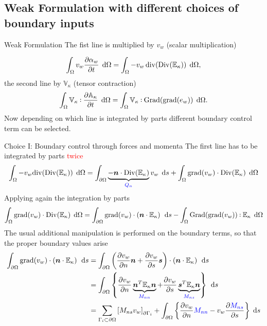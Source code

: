 \documentclass{beamer}
\def\onedot{$\mathsurround0pt\ldotp$}
\def\cddot{%
	\mathbin{\vcenter{\baselineskip.67ex
			\hbox{\onedot}\hbox{\onedot}}%
}}
\newcommand{\blue}[1]{\textcolor{blue}{#1}}
\newcommand{\red}[1]{\textcolor{red}{#1}}
\begin{document}
\subsection{Weak Formulation with different choices of boundary inputs}

\begin{frame}{Weak Formulation}
The fist line  is multiplied  by $v_w$ (scalar multiplication)

\[
\int_{\Omega} v_w \diffp{\alpha_w}{t} \,  \d\Omega =  \int_{\Omega} -v_w \, \mathrm{div}(\mathrm{Div}(\mathbb{E}_{\kappa})) \, \d\Omega,
\]
the second line by $\mathbb{V}_{\kappa}$ (tensor contraction)
\[
\int_{\Omega} \mathbb{V}_{\kappa} \cddot \diffp{\mathbb{A}_{\kappa}}{t} \,  \d\Omega = \int_{\Omega} \mathbb{V}_{\kappa} \cddot  \mathrm{Grad}(\mathrm{grad}(e_w)) \,   \d\Omega.
\]
Now depending on which line is integrated by parts different boundary control term can be selected. 
\end{frame}

\begin{frame}{Choice I: Boundary control through forces and momenta}
The first line has to be integrated by parts \red{twice}
\small
\begin{equation*}
\int_{\Omega} - v_w \mathrm{div}(\mathrm{Div}(\mathbb{E}_{\kappa})) \, \d\Omega = \int_{\partial \Omega} \underbrace{- \bm{n} \cdot \mathrm{Div}(\mathbb{E}_{\kappa})}_{\blue{Q_n}} v_w \, \d{s} + \int_{\Omega} \mathrm{grad}(v_w)  \cdot \mathrm{Div}(\mathbb{E}_{\kappa}) \, \d\Omega
\end{equation*}
\normalsize
Applying again the integration by parts
\small
\begin{equation*}
\int_{\Omega} \mathrm{grad}(v_w)  \cdot \mathrm{Div}(\mathbb{E}_{\kappa}) \, \d\Omega = \int_{\partial \Omega} \mathrm{grad}(v_w)  \cdot \left( \bm{n} \cdot \mathbb{E}_{\kappa} \right) \, \d{s} -  \int_{\Omega}\mathrm{Grad}(\mathrm{grad}(v_w))  \cddot \mathbb{E}_{\kappa} \, \d\Omega
\end{equation*}
\normalsize
The usual additional manipulation is performed on the boundary terms, so that the proper boundary values arise
\small
\begin{equation*}
\begin{aligned}
\int_{\partial \Omega} \mathrm{grad}(v_w)  \cdot \left( \bm{n} \cdot \mathbb{E}_{\kappa} \right) \, \d{s} &= \int_{\partial \Omega} \left(\diffp{v_w}{n} \bm{n} + \diffp{v_w}{s} \bm{s} \right)  \cdot \left( \bm{n} \cdot \mathbb{E}_{\kappa} \right) \, \d{s} \\
&= \int_{\partial \Omega} \left\{  \diffp{v_w}{n}  \underbrace{\bm{n}^T \mathbb{E}_{\kappa}\bm{n}}_{\blue{M_{nn}}} +  \diffp{v_w}{s}  \underbrace{\bm{s}^T \mathbb{E}_{\kappa}\bm{n}}_{\blue{M_{ns}}} \right\}  \, \d{s} \\
&= \sum_{\Gamma_{i} \subset \partial \Omega} \left[ M_{ns} v_w \right]_{\partial \Gamma_i} + \int_{\partial \Omega} \left\{ \diffp{v_w}{n} \blue{M_{nn}}  - v_w  \diffp{\blue{M_{ns}}}{s} \right\} \d{s}
\end{aligned}
\end{equation*}
\end{frame}
\end{document}
